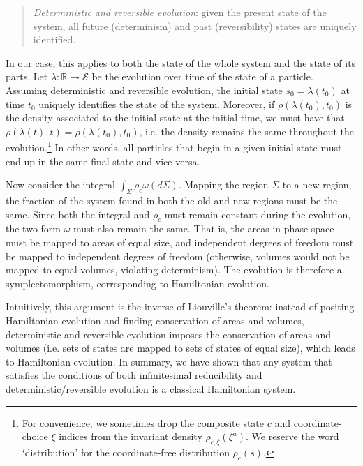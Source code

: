 \documentclass[12pt, english, twoside]{article} %
\newcommand\bs{\begin{singlespace}}
\newcommand\es{\end{singlespace}}
\begin{document}
\begin{quotation}
\bs
\noindent
\textit{Deterministic and reversible evolution}: given the present state of the system, all future (determinism) and past (reversibility) states are uniquely identified. \es
\end{quotation}

In our case, this applies to both the state of the whole system and the state of its parts. Let $\lambda: \mathbb{R} \to \mathcal{S}$ be the evolution over time of the state of a particle. Assuming deterministic and reversible evolution, the initial state $s_0 = \lambda(t_0)$ at time $t_0$ uniquely identifies the state of the system. Moreover, if $\rho(\lambda(t_0), t_0)$ is the density associated to the initial state at the initial time, we must have that $\rho(\lambda(t), t) = \rho(\lambda(t_0), t_0)$, i.e. the density remains the same throughout the evolution.\footnote{For convenience, we sometimes drop the composite state $c$ and coordinate-choice $\xi$ indices from the invariant density $\rho_{c, \xi} (\xi^a)$. We reserve the word `distribution' for the coordinate-free distribution $\rho_c (s)$. } In other words, all particles that begin in a given initial state must end up in the same final state and vice-versa.  

Now consider the integral $\int_{\Sigma} \rho_c \omega(d\Sigma)$. Mapping the region $\Sigma$ to a new region, the fraction of the system found in both the old and new regions must be the same. Since both the integral and $\rho_c$ must remain constant during the evolution, the two-form $\omega$ must also remain the same. That is, the areas in phase space must be mapped to areas of equal size, and independent degrees of freedom must be mapped to independent degrees of freedom (otherwise, volumes would not be mapped to equal volumes, violating determinism). The evolution is therefore a symplectomorphism, corresponding to Hamiltonian evolution. 

Intuitively, this argument is the inverse of Liouville's theorem: instead of positing Hamiltonian evolution and finding conservation of areas and volumes, deterministic and reversible evolution imposes the conservation of areas and volumes (i.e. sets of states are mapped to sets of states of equal size), which leads to Hamiltonian evolution. In summary, we have shown that any system that satisfies the conditions of both infinitesimal reducibility and deterministic/reversible evolution is a classical Hamiltonian system.
\end{document}
